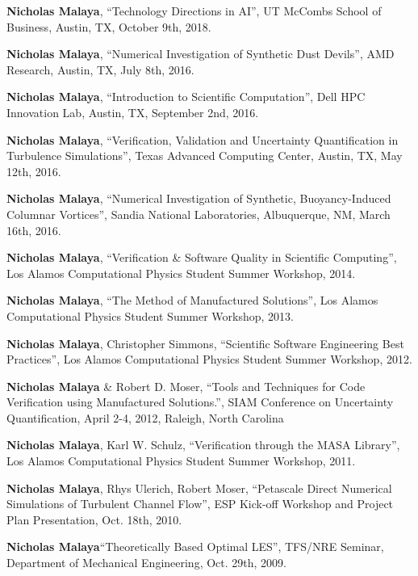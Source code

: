 
\textbf{Nicholas Malaya}, ``Technology Directions in AI'', UT McCombs School of Business, 
		 Austin, TX, October 9th, 2018. 

\blankline

\textbf{Nicholas Malaya}, ``Numerical Investigation of Synthetic Dust Devils'', AMD Research, 
		 Austin, TX, July 8th, 2016. 

\blankline

\textbf{Nicholas Malaya}, ``Introduction to Scientific Computation'', Dell HPC Innovation Lab, 
		 Austin, TX, September 2nd, 2016. 

\blankline

\textbf{Nicholas Malaya}, ``Verification, Validation and Uncertainty Quantification in Turbulence Simulations'', Texas Advanced Computing Center, 
		 Austin, TX, May 12th, 2016. 

\blankline

\textbf{Nicholas Malaya}, ``Numerical Investigation of Synthetic, Buoyancy-Induced Columnar Vortices'', Sandia National Laboratories, 
		 Albuquerque, NM, March 16th, 2016. 

\blankline

\textbf{Nicholas Malaya}, ``Verification \& Software Quality in Scientific
      Computing'', Los Alamos Computational Physics Student Summer
      Workshop, 2014. 

\blankline

\textbf{Nicholas Malaya}, ``The Method of Manufactured Solutions'', Los Alamos
      Computational Physics Student Summer Workshop, 2013.

\blankline

\textbf{Nicholas Malaya}, Christopher Simmons, ``Scientific Software Engineering
      Best Practices'', Los Alamos Computational Physics Student Summer
      Workshop, 2012.

\blankline

\textbf{Nicholas Malaya} \& Robert D. Moser, ``Tools and Techniques for Code
Verification using Manufactured Solutions.'', SIAM Conference on
Uncertainty Quantification, April 2-4, 2012, Raleigh, North Carolina 

\blankline

\textbf{Nicholas Malaya}, Karl W. Schulz, ``Verification through the MASA
      Library'', Los Alamos Computational Physics Student Summer
      Workshop, 2011.

\blankline

\textbf{Nicholas Malaya}, Rhys Ulerich, Robert Moser, ``Petascale Direct
Numerical Simulations of Turbulent Channel Flow'', ESP Kick-off
Workshop and Project Plan Presentation, Oct. 18th, 2010.

\blankline

\textbf{Nicholas Malaya}``Theoretically Based Optimal LES'', TFS/NRE
Seminar, Department of Mechanical Engineering, Oct. 29th, 2009. 



